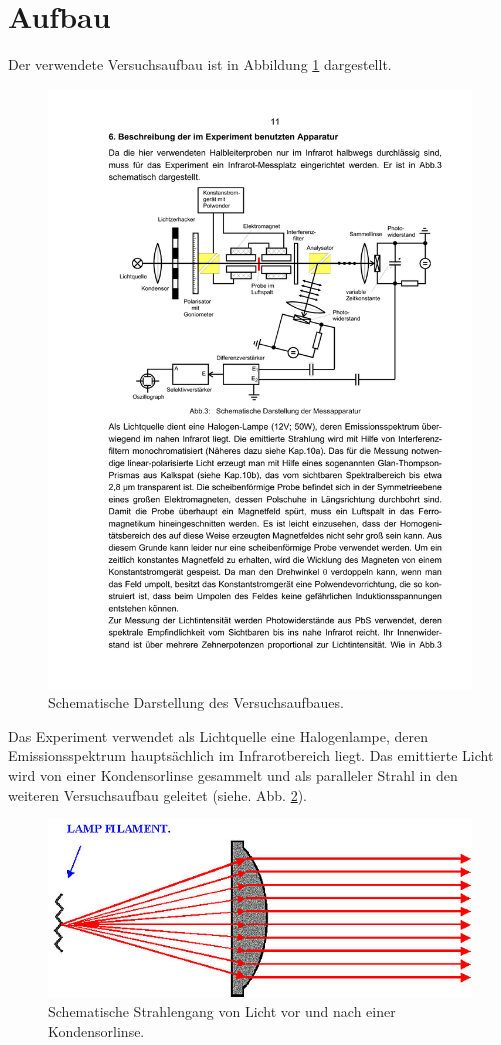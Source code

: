 \section{Aufbau}
\label{sec:Aufbau}

Der verwendete Versuchsaufbau ist in Abbildung \ref{fig:aufbau} dargestellt.
\begin{figure}
\centering
\includegraphics[width=0.7\linewidth]{./content/images/aufbau.pdf}
\caption{Schematische Darstellung des Versuchsaufbaues.}
\label{fig:aufbau}
\end{figure}
Das Experiment verwendet als Lichtquelle eine Halogenlampe, deren Emissionsspektrum
hauptsächlich im Infrarotbereich liegt.
Das emittierte Licht wird von einer Kondensorlinse gesammelt und als paralleler Strahl in den weiteren Versuchsaufbau geleitet (siehe. Abb. \ref{fig:kondensorlinse}).
\begin{figure}
\centering
\includegraphics[width=0.45\linewidth]{./content/images/condensor.jpeg}
\caption{Schematische Strahlengang von Licht vor und nach einer Kondensorlinse.}
\label{fig:kondensorlinse}
\end{figure}
